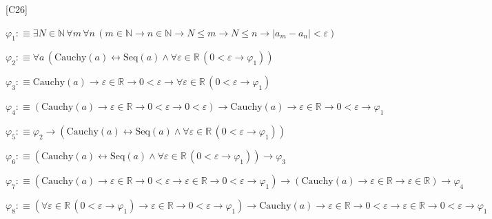 \begin{fullproof}{[C26]}
\begin{ptree}
\end{ptree}
\begin{abbrevlist}
\item $\varphi_{1} :\equiv \exists N \in \mathbb{N}\,\forall m\,\forall n\,(m \in \mathbb{N} \to n \in \mathbb{N} \to N \leq m \to N \leq n \to \lvert a_{m} - a_{n} \rvert < \varepsilon)$
\item $\varphi_{2} :\equiv \forall a\,(\mathrm{Cauchy}(a) \leftrightarrow \mathrm{Seq}(a) \land \forall \varepsilon \in \mathbb{R}\,(0 < \varepsilon \to \varphi_{1}))$
\item $\varphi_{3} :\equiv \mathrm{Cauchy}(a) \to \varepsilon \in \mathbb{R} \to 0 < \varepsilon \to \forall \varepsilon \in \mathbb{R}\,(0 < \varepsilon \to \varphi_{1})$
\item $\varphi_{4} :\equiv (\mathrm{Cauchy}(a) \to \varepsilon \in \mathbb{R} \to 0 < \varepsilon \to 0 < \varepsilon) \to \mathrm{Cauchy}(a) \to \varepsilon \in \mathbb{R} \to 0 < \varepsilon \to \varphi_{1}$
\item $\varphi_{5} :\equiv \varphi_{2} \to (\mathrm{Cauchy}(a) \leftrightarrow \mathrm{Seq}(a) \land \forall \varepsilon \in \mathbb{R}\,(0 < \varepsilon \to \varphi_{1}))$
\item $\varphi_{6} :\equiv (\mathrm{Cauchy}(a) \leftrightarrow \mathrm{Seq}(a) \land \forall \varepsilon \in \mathbb{R}\,(0 < \varepsilon \to \varphi_{1})) \to \varphi_{3}$
\item $\varphi_{7} :\equiv (\mathrm{Cauchy}(a) \to \varepsilon \in \mathbb{R} \to 0 < \varepsilon \to \varepsilon \in \mathbb{R} \to 0 < \varepsilon \to \varphi_{1}) \to (\mathrm{Cauchy}(a) \to \varepsilon \in \mathbb{R} \to \varepsilon \in \mathbb{R}) \to \varphi_{4}$
\item $\varphi_{8} :\equiv (\forall \varepsilon \in \mathbb{R}\,(0 < \varepsilon \to \varphi_{1}) \to \varepsilon \in \mathbb{R} \to 0 < \varepsilon \to \varphi_{1}) \to \mathrm{Cauchy}(a) \to \varepsilon \in \mathbb{R} \to 0 < \varepsilon \to \varepsilon \in \mathbb{R} \to 0 < \varepsilon \to \varphi_{1}$
\end{abbrevlist}
\end{fullproof}
